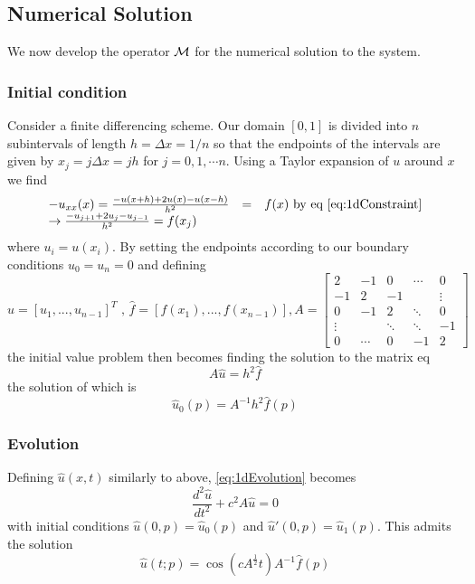 \subsection{Numerical Solution}
We now develop the operator $\mathcal{M}$ for the numerical solution to the system.

\subsubsection{Initial condition}
Consider a finite differencing scheme. Our domain $[0,1]$ is divided into $n$ subintervals of length $h=\Delta x = 1 /n$ so that the endpoints of the intervals are given by $x_j = j  \Delta x = jh$ for $j= 0, 1, \cdots n$. Using a Taylor expansion of $u$ around $x$ we find
\begin{equation}
\begin{array}{lcl}
-u_{xx}(x)=\frac{-u(x+h)+2u(x)-u(x-h)}{h^2}&=& f(x)  \mbox{ by eq \ref{eq:1dConstraint}} \\
\rightarrow \frac{-u_{j+1} + 2u_j - u_{j-1} }{h^2} = f(x_j)
\end{array}
\end{equation}
where $u_i = u(x_i)$. By setting the endpoints according to our boundary conditions $u_0 = u_n=0$ and defining
\begin{equation}
\hat{u}=[u_1,...,u_{n-1}]^T \mbox{ , } \hat{f} = [f(x_1),...,f(x_{n-1})], A= \left[\begin{array}{ccccc}
2  & -1 & 0  & \cdots & 0\\
-1 & 2  & -1 &  & \vdots \\
0  & -1 & 2  & \ddots & 0 \\
\vdots & & \ddots & \ddots & -1 \\
0 & \cdots & 0 & -1 & 2 
\end{array}\right]
\end{equation}
the initial value problem then becomes finding the solution to the matrix eq
\begin{equation}
A \hat{u} = h^2 \hat{f}
\end{equation}
the solution of which is 
\begin{equation}
\hat{u}_0(p) = A^{-1}h^2\hat{f}(p)
\end{equation}

\subsubsection{Evolution}
Defining $\hat{u}(x,t)$ similarly to above, \ref{eq:1dEvolution} becomes
\begin{equation}
\frac{d^2 \hat{u}}{dt^2}+c^2 A \hat{u}=0
\end{equation}
with initial conditions $\hat{u}(0,p)=\hat{u}_0(p)$ and $\hat{u}'(0,p)=\hat{u}_1(p)$. This admits the solution
\begin{equation}\label{eq:dispSoln}
\hat{u}(t;p)=\cos(c A^{\frac{1}{2}}t)A^{-1}\hat{f}(p)
\end{equation}

